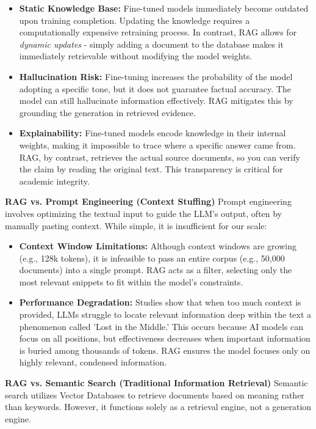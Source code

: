 \begin{itemize}
    \item \textbf{Static Knowledge Base:} Fine-tuned models immediately become outdated upon training completion. Updating the knowledge requires a computationally expensive retraining process. In contrast, RAG allows for \textit{dynamic updates} - simply adding a document to the database makes it immediately retrievable without modifying the model weights.
    \item \textbf{Hallucination Risk:} Fine-tuning increases the probability of the model adopting a specific tone, but it does not guarantee factual accuracy. The model can still hallucinate information effectively. RAG mitigates this by grounding the generation in retrieved evidence.
    \item \textbf{Explainability:} Fine-tuned models encode knowledge in their internal weights, making it impossible to trace where a specific answer came from. RAG, by contrast, retrieves the actual source documents, so you can verify the claim by reading the original text. This transparency is critical for academic integrity.
\end{itemize}

\textbf{RAG vs. Prompt Engineering (Context Stuffing)}
Prompt engineering involves optimizing the textual input to guide the LLM's output, often by manually pasting context. While simple, it is insufficient for our scale:

\begin{itemize}
    \item \textbf{Context Window Limitations:} Although context windows are growing (e.g., 128k tokens), it is infeasible to pass an entire corpus (e.g., 50,000 documents) into a single prompt. RAG acts as a filter, selecting only the most relevant snippets to fit within the model's constraints.
    \item \textbf{Performance Degradation:} Studies show that when too much context is provided, LLMs struggle to locate relevant information deep within the text a phenomenon called 'Lost in the Middle.' This occurs because AI models can focus on all positions, but effectiveness decreases when important information is buried among thousands of tokens. RAG ensures the model focuses only on highly relevant, condensed information.
\end{itemize}

\textbf{RAG vs. Semantic Search (Traditional Information Retrieval)}
Semantic search utilizes Vector Databases to retrieve documents based on meaning rather than keywords. However, it functions solely as a retrieval engine, not a generation engine.

